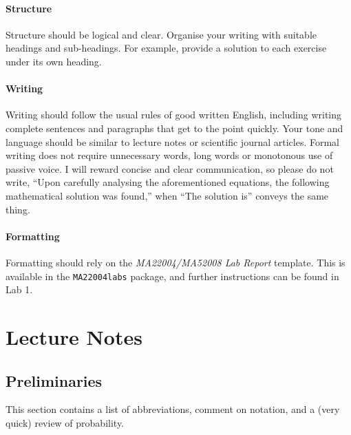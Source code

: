 \documentclass[
  a4paper,
  DIV=11,
  numbers=noendperiod,
  oneside]{scrreprt}
\theoremstyle{plain}
\theoremstyle{definition}
\theoremstyle{definition}
\theoremstyle{definition}
\theoremstyle{plain}
\theoremstyle{remark}
\begin{document}
\subsection*{Structure}\label{w-structure}

Structure should be logical and clear. Organise your writing with
suitable headings and sub-headings. For example, provide a solution to
each exercise under its own heading.

\subsection*{Writing}\label{w-eng}

Writing should follow the usual rules of good written English, including
writing complete sentences and paragraphs that get to the point quickly.
Your tone and language should be similar to lecture notes or scientific
journal articles. Formal writing does not require unnecessary words,
long words or monotonous use of passive voice. I will reward concise and
clear communication, so please do not write, ``Upon carefully analysing
the aforementioned equations, the following mathematical solution was
found,'' when ``The solution is'' conveys the same thing.

\subsection*{Formatting}\label{w-format}

Formatting should rely on the \emph{MA22004/MA52008 Lab Report}
template. This is available in the \texttt{MA22004labs} package, and
further instructions can be found in Lab 1.

\part{Lecture Notes}

\chapter*{Preliminaries}\label{preliminaries}


This section contains a list of abbreviations, comment on notation, and
a (very quick) review of probability.
\end{document}
